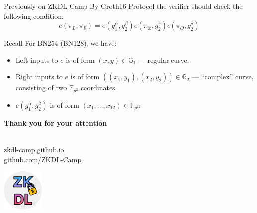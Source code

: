 \documentclass{zkdl-presentation-template}
\begin{document}
    \begin{frame}{Previously on ZKDL Camp}
        By Groth16 Protocol the verifier should check the following condition:
        \begin{equation*}
            e(\pi_L, \pi_R) = e(g_1^{\alpha}, g_2^{\beta})e(\pi_{\text{io}},g_2^{\gamma})e(\pi_O,g_2^{\delta})
        \end{equation*}

        \begin{alertblock}{Recall}
            For BN254 (BN128), we have:
            \begin{itemize}
                \item Left inputs to $e$ is of form $(x,y) \in \mathbb{G}_1$ --- regular curve.
                \item Right inputs to $e$ is of form $((x_1,y_1),(x_2,y_2)) \in \mathbb{G}_2$ --- ``complex'' curve, consisting of two $\mathbb{F}_{p^2}$ coordinates.
                \item $e(g_1^{\alpha}, g_2^{\beta})$ is of form $(x_1,\dots,x_{12}) \in \mathbb{F}_{p^{12}}$
            \end{itemize}
        \end{alertblock}
    \end{frame}

    \begin{frame}
        \centering
        \LARGE
        \textbf{Thank you for your attention} \\

        \vspace{0.2cm} \Huge {} \large \\

        \vspace{1cm}

        \href{https://zkdl-camp.github.io/}{\hspace{.325em}zkdl-camp.github.io} \\

        \href{https://github.com/ZKDL-Camp}{\hspace{.325em}github.com/ZKDL-Camp}

        \begin{center}
            \includegraphics[width=0.15\textwidth]{images/logo.png}
        \end{center}
    \end{frame}
\end{document}
